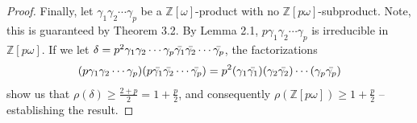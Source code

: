 \documentclass[10pt,a4paper]{amsart}
\newcommand{\bbz}{\mathbb{Z}}
\renewcommand{\geq}{\geqslant}
\begin{document}
\begin{proof}
    Finally, let $\gamma_1 \gamma_2 \dotsm \gamma_p$ be a $\bbz[\omega]$-product with no $\bbz[p\omega]$-subproduct. Note, this is guaranteed by Theorem 3.2. By Lemma 2.1, $p \gamma_1 \gamma_2 \dotsm \gamma_p$ is irreducible in $\bbz[p\omega]$. If we let $\delta = p^2 \gamma_1 \gamma_2 \dotsm \gamma_p \Bar{\gamma_1} \Bar{\gamma_2} \dotsm \Bar{\gamma_p}$, the factorizations   
    \[
    (p \gamma_1 \gamma_2 \dotsm \gamma_p)(p \Bar{\gamma_1} \Bar{\gamma_2} \dotsm \Bar{\gamma_p}) = p^2 (\gamma_1 \Bar{\gamma_1})(\gamma_2 \Bar{\gamma_2})\dotsm (\gamma_p \Bar{\gamma_p})
    \]
    show us that $\rho(\delta) \geq \frac{2 + p}{2} = 1 + \frac{p}{2}$, and consequently $\rho(\bbz[p\omega]) \geq 1 + \frac{p}{2}$ -- establishing the result. 
    
\end{proof}
\end{document}
